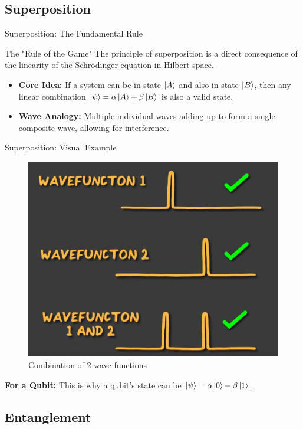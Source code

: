 \documentclass{beamer}
\begin{document}
\subsection{Superposition}

\begin{frame}[fragile]{Superposition: The Fundamental Rule}
    \begin{block}{The "Rule of the Game"}
        The principle of superposition is a direct consequence of the linearity of the Schrödinger equation in Hilbert space.
    \end{block}

    \begin{itemize}
        \item \textbf{Core Idea:} If a system can be in state $\ket{A}$ and also in state $\ket{B}$, then any linear combination $\ket{\psi} = \alpha\ket{A} + \beta\ket{B}$ is also a valid state.
        
        \item \textbf{Wave Analogy:} Multiple individual waves adding up to form a single composite wave, allowing for interference.
    \end{itemize}
\end{frame}

\begin{frame}[fragile]{Superposition: Visual Example}
    \begin{figure}
        \centering
        \includegraphics[width=0.6\linewidth]{Figures/Superposition.png}
        \caption{Combination of 2 wave functions}
        \label{fig:placeholder}
    \end{figure}
    
    \textbf{For a Qubit:} This is why a qubit's state can be $\ket{\psi} = \alpha\ket{0} + \beta\ket{1}$.
\end{frame}

\subsection{Entanglement}
\end{document}
